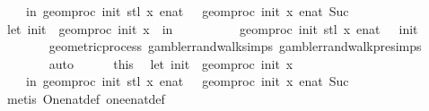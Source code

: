 \begin{isabellebody}
\ \ \ \ in\ geom{\isacharunderscore}{\kern0pt}proc\ init{\isacharprime}{\kern0pt}\ {\isacharparenleft}{\kern0pt}stl\ x{\isacharparenright}{\kern0pt}\ {\isacharparenleft}{\kern0pt}enat\ {}{\isacharparenright}{\kern0pt}\ {\isacharequal}{\kern0pt}\ geom{\isacharunderscore}{\kern0pt}proc\ init\ x\ {\isacharparenleft}{\kern0pt}enat\ {\isacharparenleft}{\kern0pt}Suc\ {}{\isacharparenright}{\kern0pt}{\isacharparenright}{\kern0pt}{\isachardoublequoteclose}\isanewline
\ \ \isamarkupfalse%
{\isacharminus}{\kern0pt}\isanewline
\ \ \ \ \isamarkupfalse%
\ {\isachardoublequoteopen}let\ init{\isacharprime}{\kern0pt}\ {\isacharequal}{\kern0pt}\ geom{\isacharunderscore}{\kern0pt}proc\ init\ x\ {}\ in\ \isanewline
\ \ \ \ \ \ \ \ \ geom{\isacharunderscore}{\kern0pt}proc\ init{\isacharprime}{\kern0pt}\ {\isacharparenleft}{\kern0pt}stl\ x{\isacharparenright}{\kern0pt}\ {\isacharparenleft}{\kern0pt}enat\ {}{\isacharparenright}{\kern0pt}\ {\isacharequal}{\kern0pt}\ init{\isacharprime}{\kern0pt}{\isachardoublequoteclose}\isanewline
\ \ \ \ \ \ \isamarkupfalse%
\ geometric{\isacharunderscore}{\kern0pt}process\ gambler{\isacharunderscore}{\kern0pt}rand{\isacharunderscore}{\kern0pt}walk{\isachardot}{\kern0pt}simps\ gambler{\isacharunderscore}{\kern0pt}rand{\isacharunderscore}{\kern0pt}walk{\isacharunderscore}{\kern0pt}pre{\isachardot}{\kern0pt}simps\isanewline
\ \ \ \ \ \ \isamarkupfalse%
\ auto\isanewline
\ \ \ \ \isamarkupfalse%
\ this\ \isamarkupfalse%
\ {\isachardoublequoteopen}let\ init{\isacharprime}{\kern0pt}\ {\isacharequal}{\kern0pt}\ geom{\isacharunderscore}{\kern0pt}proc\ init\ x\ {}\isanewline
\ \ \ \ in\ geom{\isacharunderscore}{\kern0pt}proc\ init{\isacharprime}{\kern0pt}\ {\isacharparenleft}{\kern0pt}stl\ x{\isacharparenright}{\kern0pt}\ {\isacharparenleft}{\kern0pt}enat\ {}{\isacharparenright}{\kern0pt}\ {\isacharequal}{\kern0pt}\ geom{\isacharunderscore}{\kern0pt}proc\ init\ x\ {\isacharparenleft}{\kern0pt}enat\ {\isacharparenleft}{\kern0pt}Suc\ {}{\isacharparenright}{\kern0pt}{\isacharparenright}{\kern0pt}{\isachardoublequoteclose}\isanewline
\ \ \ \ \ \ \isamarkupfalse%
\ {\isacharparenleft}{\kern0pt}metis\ One{\isacharunderscore}{\kern0pt}nat{\isacharunderscore}{\kern0pt}def\ one{\isacharunderscore}{\kern0pt}enat{\isacharunderscore}{\kern0pt}def{\isacharparenright}{\kern0pt}\isanewline
\ \ \isamarkupfalse%
\isanewline
{}\isamarkupfalse%

\end{isabellebody}
